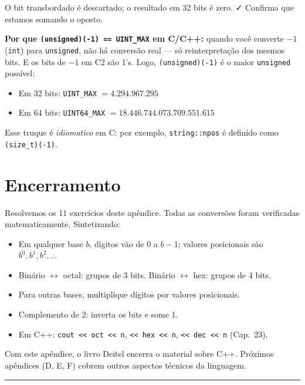 \documentclass[11pt,a4paper]{article}
\begin{document}
O bit transbordado \'e descartado; o resultado em 32 bits \'e zero. ✓ Confirma que estamos somando o oposto.

\begin{obseng}
\textbf{Por que \texttt{(unsigned)(-1) == UINT\_MAX} em C/C++:} quando voc\^e converte $-1$ (\texttt{int}) para \texttt{unsigned}, n\~ao h\'a convers\~ao real --- s\'o reinterpreta\c{c}\~ao dos mesmos bits. E os bits de $-1$ em C2 s\~ao 1's. Logo, \texttt{(unsigned)(-1)} \'e o maior \texttt{unsigned} poss\'ivel:
\begin{itemize}[leftmargin=*,itemsep=0pt]
  \item Em 32 bits: \texttt{UINT\_MAX} $= 4{.}294{.}967{.}295$
  \item Em 64 bits: \texttt{UINT64\_MAX} $= 18{.}446{.}744{.}073{.}709{.}551{.}615$
\end{itemize}
Esse truque \'e \emph{idiomatico} em C: por exemplo, \texttt{string::npos} \'e definido como \texttt{(size\_t)(-1)}.
\end{obseng}

\section*{Encerramento}

Resolvemos os 11 exerc\'icios deste ap\^endice. Todas as convers\~oes foram verificadas matematicamente. Sintetizando:

\begin{itemize}[leftmargin=*,itemsep=0pt]
  \item Em qualquer base $b$, d\'igitos v\~ao de 0 a $b-1$; valores posicionais s\~ao $b^0, b^1, b^2, \ldots$
  \item Bin\'ario $\leftrightarrow$ octal: grupos de 3 bits. Bin\'ario $\leftrightarrow$ hex: grupos de 4 bits.
  \item Para outras bases, multiplique d\'igitos por valores posicionais.
  \item Complemento de 2: inverta os bits e some 1.
  \item Em C++: \texttt{cout << oct << n}, \texttt{<< hex << n}, \texttt{<< dec << n} (Cap.~23).
\end{itemize}

Com este ap\^endice, o livro Deitel encerra o material sobre C++. Pr\'oximos ap\^endices (D, E, F) cobrem outros aspectos t\'ecnicos da linguagem.

\vspace{1em}
\begin{center}\rule{0.5\textwidth}{0.4pt}\end{center}
\end{document}
